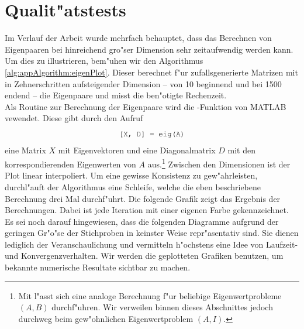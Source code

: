 \newpage
\section{Qualit"atstests}
Im Verlauf der Arbeit wurde mehrfach behauptet, dass das Berechnen von Eigenpaaren bei hinreichend gro"ser Dimension sehr zeitaufwendig werden kann. Um dies zu illustrieren, bem"uhen wir den Algorithmus \ref{alg:appAlgorithm:eigenPlot}. Dieser berechnet f"ur zufallsgenerierte Matrizen mit in Zehnerschritten aufsteigender Dimension -- von 10 beginnend und bei 1500 endend -- die Eigenpaare und misst die ben"otigte Rechenzeit.\\

Als Routine zur Berechnung der Eigenpaare wird die -Funktion von MATLAB vewendet. Diese gibt durch den Aufruf
\[
\mcode{[X, D] = eig(A)}
\]
eine Matrix $X$ mit Eigenvektoren und eine Diagonalmatrix $D$ mit den korrespondierenden Eigenwerten von $A$ aus.\footnote{Mit  l"asst sich eine analoge Berechnung f"ur beliebige Eigenwertprobleme $(A,B)$ durchf"uhren. Wir verweilen binnen dieses Abschnittes jedoch durchweg beim gew"ohnlichen Eigenwertproblem $(A,I)$.}
 Zwischen den Dimensionen ist der Plot linear interpoliert. Um eine gewisse Konsistenz zu gew"ahrleisten, durchl"auft der Algorithmus eine Schleife, welche die eben beschriebene Berechnung drei Mal durchf"uhrt. Die folgende Grafik zeigt das Ergebnis der Berechnungen. Dabei ist jede Iteration mit einer eigenen Farbe gekennzeichnet.\\

Es sei noch darauf hingewiesen, dass die folgenden Diagramme aufgrund der geringen Gr"o"se der Stichproben in keinster Weise repr"asentativ sind. Sie dienen lediglich der Veranschaulichung und vermitteln h"ochstens eine Idee von Laufzeit- und Konvergenzverhalten. Wir werden die geplotteten Grafiken benutzen, um bekannte numerische Resultate sichtbar zu machen.\\

